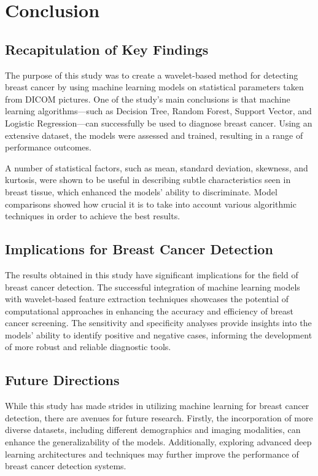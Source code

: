 \chapter{Conclusion}
\label{chap5}
\section{Recapitulation of Key Findings}
The purpose of this study was to create a wavelet-based method for detecting breast cancer by using machine learning models on statistical parameters taken from DICOM pictures. One of the study's main conclusions is that machine learning algorithms—such as Decision Tree, Random Forest, Support Vector, and Logistic Regression—can successfully be used to diagnose breast cancer. Using an extensive dataset, the models were assessed and trained, resulting in a range of performance outcomes.

A number of statistical factors, such as mean, standard deviation, skewness, and kurtosis, were shown to be useful in describing subtle characteristics seen in breast tissue, which enhanced the models' ability to discriminate. Model comparisons showed how crucial it is to take into account various algorithmic techniques in order to achieve the best results.
\section{Implications for Breast Cancer Detection}
The results obtained in this study have significant implications for the field of breast cancer detection. The successful integration of machine learning models with wavelet-based feature extraction techniques showcases the potential of computational approaches in enhancing the accuracy and efficiency of breast cancer screening. The sensitivity and specificity analyses provide insights into the models' ability to identify positive and negative cases, informing the development of more robust and reliable diagnostic tools.

\section{Future Directions}
While this study has made strides in utilizing machine learning for breast cancer detection, there are avenues for future research. Firstly, the incorporation of more diverse datasets, including different demographics and imaging modalities, can enhance the generalizability of the models. Additionally, exploring advanced deep learning architectures and techniques may further improve the performance of breast cancer detection systems.

